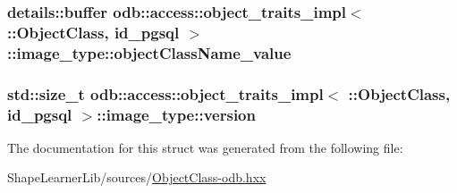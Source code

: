 \subsubsection[{object\+Class\+Name\+\_\+value}]{\setlength{\rightskip}{0pt plus 5cm}details\+::buffer odb\+::access\+::object\+\_\+traits\+\_\+impl$<$ \+::{\bf Object\+Class}, id\+\_\+pgsql $>$\+::image\+\_\+type\+::object\+Class\+Name\+\_\+value}\label{structodb_1_1access_1_1object__traits__impl_3_01_1_1_object_class_00_01id__pgsql_01_4_1_1image__type_a1c1f1c19eaa6bdc564aa4c30da26626b}
\hypertarget{structodb_1_1access_1_1object__traits__impl_3_01_1_1_object_class_00_01id__pgsql_01_4_1_1image__type_a17183f0fd7192c39daf4dabe142b771b}{}
\subsubsection[{version}]{\setlength{\rightskip}{0pt plus 5cm}std\+::size\+\_\+t odb\+::access\+::object\+\_\+traits\+\_\+impl$<$ \+::{\bf Object\+Class}, id\+\_\+pgsql $>$\+::image\+\_\+type\+::version}\label{structodb_1_1access_1_1object__traits__impl_3_01_1_1_object_class_00_01id__pgsql_01_4_1_1image__type_a17183f0fd7192c39daf4dabe142b771b}


The documentation for this struct was generated from the following file\+:\begin{DoxyCompactItemize}
\item 
Shape\+Learner\+Lib/sources/\hyperlink{_object_class-odb_8hxx}{Object\+Class-\/odb.\+hxx}\end{DoxyCompactItemize}
